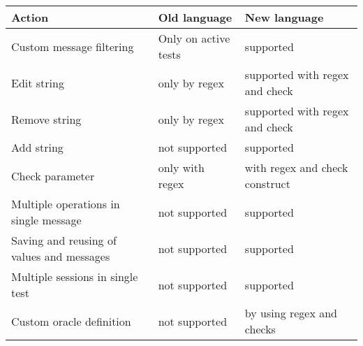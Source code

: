 \begin{center}
    \begin{tabular}{|l|l|l|}
        \hline
        Action                                    & Old language         & New language                             \\
        \hline\hline
        Custom message filtering                  & Only on active tests & supported                                \\
        Edit string                               & only by regex        & supported with regex and check \\
        Remove string                             & only by regex        & supported with regex and check\\
        Add string                                & not supported        & supported                                \\
        Check parameter                           & only with regex      & with regex and check construct           \\
        Multiple operations in single message     & not supported        & supported                                \\
        Saving and reusing of values and messages & not supported        & supported                                \\
        Multiple sessions in single test          & not supported        & supported                                \\
        Custom oracle definition                  & not supported        & by using regex and checks                \\
        \hline
    \end{tabular}
\end{center}




